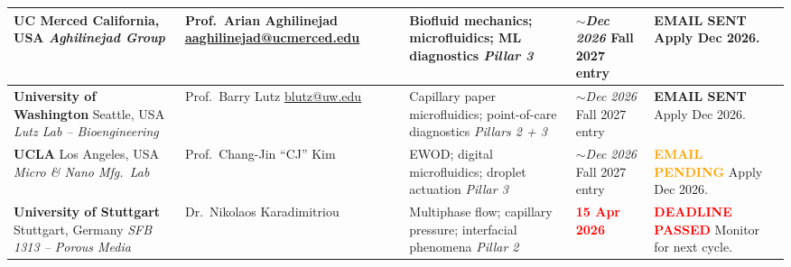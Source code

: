 \documentclass[11pt,a4paper]{article}
\begin{document}
\begin{longtable}{@{} p{3.6cm} p{3.0cm} p{2.8cm} p{1.9cm} p{3.2cm} @{}}
\midrule

\textbf{UC Merced}
\newline California, USA
\newline \textit{Aghilinejad Group}
&
Prof.\ Arian Aghilinejad \newline
\href{mailto:aaghilinejad@ucmerced.edu}{\footnotesize aaghilinejad@ucmerced.edu}
&
Biofluid mechanics; microfluidics; ML diagnostics
\newline \textit{Pillar 3}
&
\textit{$\sim$Dec 2026} \newline
{\tiny Fall 2027 entry}
&
\textcolor{done}{\textbf{EMAIL SENT}} \newline
Apply Dec 2026. \\

\midrule

\textbf{University of Washington}
\newline Seattle, USA
\newline \textit{Lutz Lab -- Bioengineering}
&
Prof.\ Barry Lutz \newline
\href{mailto:blutz@uw.edu}{blutz@uw.edu}
&
Capillary paper microfluidics; point-of-care diagnostics
\newline \textit{Pillars 2 + 3}
&
\textit{$\sim$Dec 2026} \newline
{\tiny Fall 2027 entry}
&
\textcolor{done}{\textbf{EMAIL SENT}} \newline
Apply Dec 2026. \\

\midrule

\textbf{UCLA}
\newline Los Angeles, USA
\newline \textit{Micro \& Nano Mfg.\ Lab}
&
Prof.\ Chang-Jin ``CJ'' Kim
&
EWOD; digital microfluidics; droplet actuation
\newline \textit{Pillar 3}
&
\textit{$\sim$Dec 2026} \newline
{\tiny Fall 2027 entry}
&
\textcolor{orange}{\textbf{EMAIL PENDING}} \newline
Apply Dec 2026. \\

\midrule

\textbf{University of Stuttgart}
\newline Stuttgart, Germany
\newline \textit{SFB 1313 -- Porous Media}
&
Dr.\ Nikolaos Karadimitriou
&
Multiphase flow; capillary pressure; interfacial phenomena
\newline \textit{Pillar 2}
&
\textcolor{red}{\textbf{15 Apr 2026}}
&
\textcolor{red}{\textbf{DEADLINE PASSED}} \newline
Monitor for next cycle. \\


\end{longtable}
\end{document}
